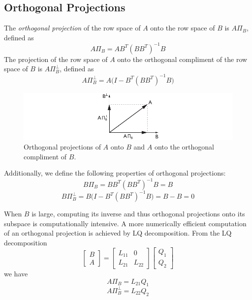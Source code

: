 \subsection{Orthogonal Projections}
The \textit{orthogonal projection} of the row space of $A$ onto the row space of $B$ is $A\Pi_B$, defined as
\begin{equation*}
A\Pi_B = AB^T(BB^T)^{-1}B
\end{equation*}
The projection of the row space of $A$ onto the orthogonal compliment of the row space of $B$ is $A\Pi_B^\perp$, defined as
\begin{equation*}
A\Pi_B^\perp = A\big(I-B^T(BB^T)^{-1}B\big)
\end{equation*}
\begin{figure}[htb!]
	\centering
	\includegraphics{../fig/orthogonal_projection.pdf}
	\caption{Orthogonal projections of $A$ onto $B$ and $A$ onto the orthogonal compliment of $B$.}
\end{figure}

Additionally, we define the following properties of orthogonal projections:
\begin{equation*}
B\Pi_B = BB^T(BB^T)^{-1}B = B
\end{equation*}
\begin{equation*}
B\Pi_B^\perp = B\big(I-B^T(BB^T)^{-1}B\big) = B-B = 0
\end{equation*}

When $B$ is large, computing its inverse and thus orthogonal projections onto its subspace is computationally intensive. A more numerically efficient computation of an orthogonal projection is achieved by LQ decomposition. From the LQ decomposition
\begin{equation*}
\begin{bmatrix}B\\A\end{bmatrix} = 
\begin{bmatrix}L_{11} & 0\\ L_{21} & L_{22}\end{bmatrix}
\begin{bmatrix}Q_1\\ Q_2\end{bmatrix}
\end{equation*}
we have
\begin{equation*}
A\Pi_B = L_{21}Q_1
\end{equation*}
\begin{equation*}
A\Pi_B^\perp = L_{22}Q_2
\end{equation*}

